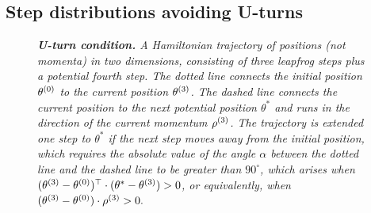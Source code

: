 \documentclass[letterpaper,11pt]{article}
\theoremstyle{plain}%
\theoremstyle{remark}
\begin{document}
\subsection{Step distributions avoiding U-turns} 

\begin{figure}[t]
\usetikzlibrary{arrows.meta, angles, quotes, calc}
\begin{center}
\end{center}
\caption{\it {\bfseries U-turn condition.}  A Hamiltonian trajectory of positions (not momenta) in two dimensions, consisting of three leapfrog steps plus a potential fourth step.  The dotted line connects the initial position $\theta^{(0)}$ to the current position $\theta^{(3)}$.  The dashed line connects the current position to the next potential position $\theta^*$ and runs in the direction of the current momentum $\rho^{(3)}$.  The trajectory is extended one step to $\theta^*$ if the next step moves away from the initial position, which requires the absolute value of the angle $\alpha$ between the dotted line and the dashed line to be greater than $90^\circ$, which arises when $(\theta^{(3)} - \theta^{(0)})^\top \cdot (\theta^* - \theta^{(3)}) > 0$, or equivalently, when $(\theta^{(3)} - \theta^{(0)}) \cdot \rho^{(3)} > 0.$}
    \label{fig:u-turn-condition}
\end{figure}
\end{document}
